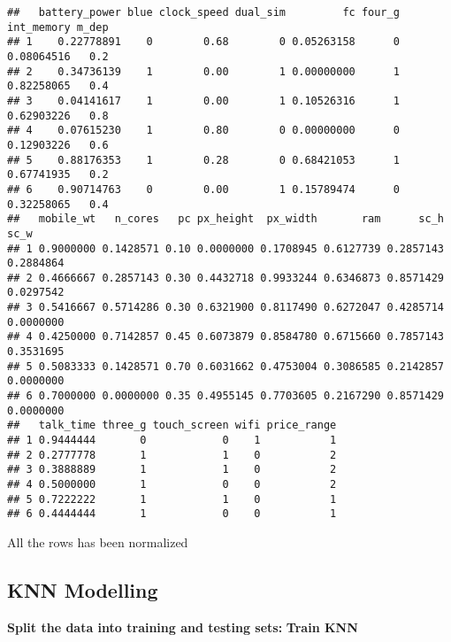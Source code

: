 \documentclass[
]{article}
\begin{document}
\begin{verbatim}
##   battery_power blue clock_speed dual_sim         fc four_g int_memory m_dep
## 1    0.22778891    0        0.68        0 0.05263158      0 0.08064516   0.2
## 2    0.34736139    1        0.00        1 0.00000000      1 0.82258065   0.4
## 3    0.04141617    1        0.00        1 0.10526316      1 0.62903226   0.8
## 4    0.07615230    1        0.80        0 0.00000000      0 0.12903226   0.6
## 5    0.88176353    1        0.28        0 0.68421053      1 0.67741935   0.2
## 6    0.90714763    0        0.00        1 0.15789474      0 0.32258065   0.4
##   mobile_wt   n_cores   pc px_height  px_width       ram      sc_h      sc_w
## 1 0.9000000 0.1428571 0.10 0.0000000 0.1708945 0.6127739 0.2857143 0.2884864
## 2 0.4666667 0.2857143 0.30 0.4432718 0.9933244 0.6346873 0.8571429 0.0297542
## 3 0.5416667 0.5714286 0.30 0.6321900 0.8117490 0.6272047 0.4285714 0.0000000
## 4 0.4250000 0.7142857 0.45 0.6073879 0.8584780 0.6715660 0.7857143 0.3531695
## 5 0.5083333 0.1428571 0.70 0.6031662 0.4753004 0.3086585 0.2142857 0.0000000
## 6 0.7000000 0.0000000 0.35 0.4955145 0.7703605 0.2167290 0.8571429 0.0000000
##   talk_time three_g touch_screen wifi price_range
## 1 0.9444444       0            0    1           1
## 2 0.2777778       1            1    0           2
## 3 0.3888889       1            1    0           2
## 4 0.5000000       1            0    0           2
## 5 0.7222222       1            1    0           1
## 6 0.4444444       1            0    0           1
\end{verbatim}

All the rows has been normalized

\subsection{KNN Modelling}\label{knn-modelling}

\textbf{Split the data into training and testing sets:} \textbf{Train
KNN}
\end{document}
